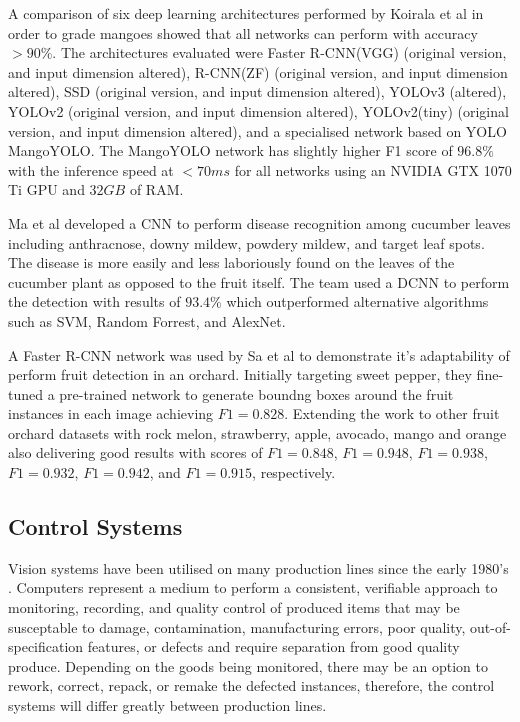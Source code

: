 \documentclass[fleqn,twoside]{article}
\begin{document}
A comparison of six deep learning architectures performed by Koirala et al \cite{koirala} in order to grade mangoes showed that all networks can perform with accuracy $>90\%$. The architectures evaluated were Faster R-CNN(VGG) (original version, and input dimension altered), R-CNN(ZF) (original version, and input dimension altered), SSD (original version, and input dimension altered), YOLOv3 (altered), YOLOv2 (original version, and input dimension altered), YOLOv2(tiny) (original version, and input dimension altered), and a specialised network based on YOLO MangoYOLO. The MangoYOLO network has slightly higher F1 score of $96.8\%$ with the inference speed at $<70ms$ for all networks using an NVIDIA GTX 1070 Ti GPU and $32GB$ of RAM.

Ma et al \cite{ma} developed a CNN to perform disease recognition among cucumber leaves including anthracnose, downy mildew, powdery mildew, and target leaf spots. The disease is more easily and less laboriously found on the leaves of the cucumber plant as opposed to the fruit itself. The team used a DCNN to perform the detection with results of $93.4\%$ which outperformed alternative algorithms such as SVM, Random Forrest, and AlexNet.

   
A Faster R-CNN network was used by Sa et al \cite{sa} to demonstrate it's adaptability of perform fruit detection in an orchard. Initially targeting sweet pepper, they fine-tuned a pre-trained network to generate boundng boxes around the fruit instances in each image achieving $F1=0.828$. Extending the work to other fruit orchard datasets with rock melon, strawberry, apple, avocado, mango and orange also delivering good results with scores of $F1=0.848$, $F1=0.948$, $F1=0.938$, $F1=0.932$, $F1=0.942$, and $F1=0.915$, respectively. 




\subsection{Control Systems}
\label{sec:control_sys}

Vision systems have been utilised on many production lines since the early 1980's \cite{kruger}. Computers represent a medium to perform a consistent, verifiable approach to monitoring, recording, and quality control of produced items that may be susceptable to damage, contamination, manufacturing errors, poor quality, out-of-specification features, or defects and require separation from good quality produce. Depending on the goods being monitored, there may be an option to rework, correct, repack, or remake the defected instances, therefore, the control systems will differ greatly between production lines.   
\end{document}
